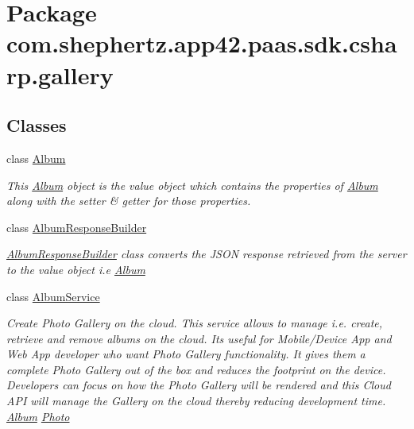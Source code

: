 \hypertarget{namespacecom_1_1shephertz_1_1app42_1_1paas_1_1sdk_1_1csharp_1_1gallery}{\section{Package com.\+shephertz.\+app42.\+paas.\+sdk.\+csharp.\+gallery}
\label{namespacecom_1_1shephertz_1_1app42_1_1paas_1_1sdk_1_1csharp_1_1gallery}
}
\subsection*{Classes}
\begin{DoxyCompactItemize}
\item 
class \hyperlink{classcom_1_1shephertz_1_1app42_1_1paas_1_1sdk_1_1csharp_1_1gallery_1_1_album}{Album}
\begin{DoxyCompactList}\small\item\em This \hyperlink{classcom_1_1shephertz_1_1app42_1_1paas_1_1sdk_1_1csharp_1_1gallery_1_1_album}{Album} object is the value object which contains the properties of \hyperlink{classcom_1_1shephertz_1_1app42_1_1paas_1_1sdk_1_1csharp_1_1gallery_1_1_album}{Album} along with the setter \& getter for those properties. \end{DoxyCompactList}\item 
class \hyperlink{classcom_1_1shephertz_1_1app42_1_1paas_1_1sdk_1_1csharp_1_1gallery_1_1_album_response_builder}{Album\+Response\+Builder}
\begin{DoxyCompactList}\small\item\em \hyperlink{classcom_1_1shephertz_1_1app42_1_1paas_1_1sdk_1_1csharp_1_1gallery_1_1_album_response_builder}{Album\+Response\+Builder} class converts the J\+S\+O\+N response retrieved from the server to the value object i.\+e \hyperlink{classcom_1_1shephertz_1_1app42_1_1paas_1_1sdk_1_1csharp_1_1gallery_1_1_album}{Album} \end{DoxyCompactList}\item 
class \hyperlink{classcom_1_1shephertz_1_1app42_1_1paas_1_1sdk_1_1csharp_1_1gallery_1_1_album_service}{Album\+Service}
\begin{DoxyCompactList}\small\item\em Create Photo Gallery on the cloud. This service allows to manage i.\+e. create, retrieve and remove albums on the cloud. Its useful for Mobile/\+Device App and Web App developer who want Photo Gallery functionality. It gives them a complete Photo Gallery out of the box and reduces the footprint on the device. Developers can focus on how the Photo Gallery will be rendered and this Cloud A\+P\+I will manage the Gallery on the cloud thereby reducing development time. \hyperlink{}{Album} \hyperlink{}{Photo} \end{DoxyCompactList}\item 

\end{DoxyCompactItemize}
